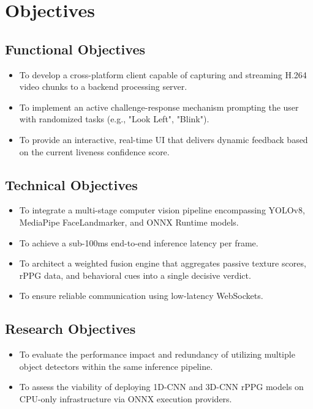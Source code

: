 \documentclass[12pt, a4paper]{report}
\begin{document}
\chapter{Objectives}

\section{Functional Objectives}
\begin{itemize}
    \item To develop a cross-platform client capable of capturing and streaming H.264 video chunks to a backend processing server.
    \item To implement an active challenge-response mechanism prompting the user with randomized tasks (e.g., "Look Left", "Blink").
    \item To provide an interactive, real-time UI that delivers dynamic feedback based on the current liveness confidence score.
\end{itemize}

\section{Technical Objectives}
\begin{itemize}
    \item To integrate a multi-stage computer vision pipeline encompassing YOLOv8, MediaPipe FaceLandmarker, and ONNX Runtime models.
    \item To achieve a sub-100ms end-to-end inference latency per frame.
    \item To architect a weighted fusion engine that aggregates passive texture scores, rPPG data, and behavioral cues into a single decisive verdict.
    \item To ensure reliable communication using low-latency WebSockets.
\end{itemize}

\section{Research Objectives}
\begin{itemize}
    \item To evaluate the performance impact and redundancy of utilizing multiple object detectors within the same inference pipeline.
    \item To assess the viability of deploying 1D-CNN and 3D-CNN rPPG models on CPU-only infrastructure via ONNX execution providers.
\end{itemize}
\end{document}
